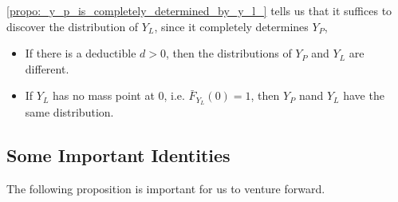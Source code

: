 \documentclass[notoc,notitlepage]{tufte-book}
\begin{document}
\begin{note}
  \cref{propo:_y_p_is_completely_determined_by_y_l_} tells us that it suffices to discover the distribution of $Y_L$, since it completely determines $Y_P$,
\end{note}

\begin{remark}
  \begin{itemize}
    \item If there is a deductible $d > 0$, then the distributions of $Y_P$ and $Y_L$ are  different.
    \item If $Y_L$ has no mass point at $0$, i.e. $\bar{F}_{Y_L}(0) = 1$, then $Y_P$ nand $Y_L$ have the same distribution.
  \end{itemize}
\end{remark}


\subsection{Some Important Identities}%
\label{sub:some_important_identities}

The following proposition is important for us to venture forward.
\end{document}
